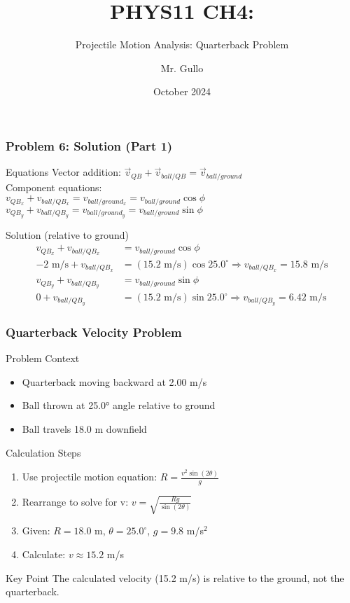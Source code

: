 \documentclass{beamer}
\begin{document}
\begin{frame}
\frametitle{Problem 6: Solution (Part 1)}
\begin{block}{Equations}
Vector addition: $\vec{v}_{QB} + \vec{v}_{ball/QB} = \vec{v}_{ball/ground}$\\
Component equations:\\ 
$v_{QB_x} + v_{ball/QB_x} = v_{ball/ground_x} = v_{ball/ground} \cos \phi$\\
$v_{QB_y} + v_{ball/QB_y} = v_{ball/ground_y} = v_{ball/ground} \sin \phi$
\end{block}
\begin{block}{Solution}
(relative to ground)
\begin{align*}
v_{QB_x} + v_{ball/QB_x} &= v_{ball/ground} \cos \phi \\
-2 \text{ m/s} + v_{ball/QB_x} &= (15.2 \text{ m/s}) \cos 25.0^{\circ} \Rightarrow v_{ball/QB_x} = 15.8 \text{ m/s}\\
v_{QB_y} + v_{ball/QB_y} &= v_{ball/ground} \sin \phi \\
0 + v_{ball/QB_y} &= (15.2 \text{ m/s}) \sin 25.0^{\circ} \Rightarrow v_{ball/QB_y} = 6.42 \text{ m/s}
\end{align*}
\end{block}
\end{frame}

\title[Projectile Motion Analysis]{PHYS11 CH4:}
\subtitle{Projectile Motion Analysis: Quarterback Problem}
\author[Mr. Gullo]{Mr. Gullo}
\date[Oct 2024]{October 2024}


\begin{frame}
\frametitle{Quarterback Velocity Problem}
\begin{block}{Problem Context}
\begin{itemize}
    \item Quarterback moving backward at 2.00 m/s
    \item Ball thrown at 25.0° angle relative to ground
    \item Ball travels 18.0 m downfield
\end{itemize}
\end{block}

\begin{block}{Calculation Steps}
\begin{enumerate}
    \item Use projectile motion equation: $R = \frac{v^2 \sin(2\theta)}{g}$
    \item Rearrange to solve for v: $v = \sqrt{\frac{R g}{\sin(2\theta)}}$
    \item Given: $R = 18.0$ m, $\theta = 25.0^{\circ}$, $g = 9.8$ m/s$^2$
    \item Calculate: $v \approx 15.2$ m/s
\end{enumerate}
\end{block}

\begin{alertblock}{Key Point}
The calculated velocity (15.2 m/s) is relative to the ground, not the quarterback.
\end{alertblock}
\end{frame}
\end{document}
